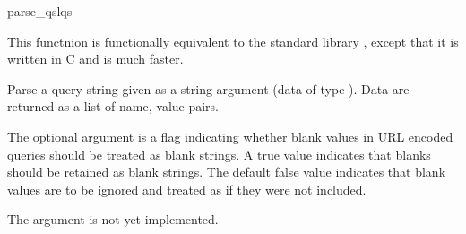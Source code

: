 \begin{funcdesc}{parse_qsl}{qs}

This functnion is functionally equivalent to the standard library
 , except that it is written in C and is
much faster. 

Parse a query string given as a string argument (data of type
).  Data are
returned as a list of name, value pairs.

The optional argument  is a flag indicating
whether blank values in URL encoded queries should be treated as blank
strings.  A true value indicates that blanks should be retained as
blank strings.  The default false value indicates that blank values
are to be ignored and treated as if they were not included.

 The  argument is not yet implemented.

\end{funcdesc}

